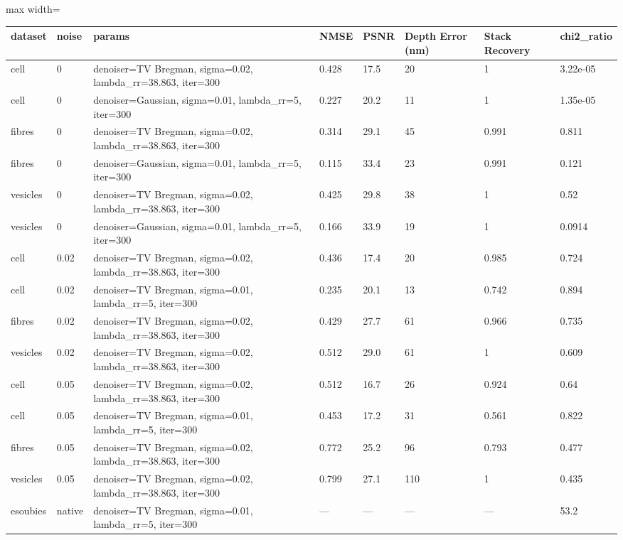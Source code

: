 \begin{center}\begin{minipage}{\linewidth}\centering
{}
\begin{adjustbox}{max width=\linewidth}
\begin{tabular}{llllllll}
\toprule
dataset & noise & params & NMSE & PSNR & Depth Error (nm) & Stack Recovery & chi2\_ratio \\
\midrule
cell & 0 & denoiser=TV Bregman, sigma=0.02, lambda\_rr=38.863, iter=300 & 0.428 & 17.5 & 20 & 1 & 3.22e-05 \\
cell & 0 & denoiser=Gaussian, sigma=0.01, lambda\_rr=5, iter=300 & 0.227 & 20.2 & 11 & 1 & 1.35e-05 \\
fibres & 0 & denoiser=TV Bregman, sigma=0.02, lambda\_rr=38.863, iter=300 & 0.314 & 29.1 & 45 & 0.991 & 0.811 \\
fibres & 0 & denoiser=Gaussian, sigma=0.01, lambda\_rr=5, iter=300 & 0.115 & 33.4 & 23 & 0.991 & 0.121 \\
vesicles & 0 & denoiser=TV Bregman, sigma=0.02, lambda\_rr=38.863, iter=300 & 0.425 & 29.8 & 38 & 1 & 0.52 \\
vesicles & 0 & denoiser=Gaussian, sigma=0.01, lambda\_rr=5, iter=300 & 0.166 & 33.9 & 19 & 1 & 0.0914 \\
cell & 0.02 & denoiser=TV Bregman, sigma=0.02, lambda\_rr=38.863, iter=300 & 0.436 & 17.4 & 20 & 0.985 & 0.724 \\
cell & 0.02 & denoiser=TV Bregman, sigma=0.01, lambda\_rr=5, iter=300 & 0.235 & 20.1 & 13 & 0.742 & 0.894 \\
fibres & 0.02 & denoiser=TV Bregman, sigma=0.02, lambda\_rr=38.863, iter=300 & 0.429 & 27.7 & 61 & 0.966 & 0.735 \\
vesicles & 0.02 & denoiser=TV Bregman, sigma=0.02, lambda\_rr=38.863, iter=300 & 0.512 & 29.0 & 61 & 1 & 0.609 \\
cell & 0.05 & denoiser=TV Bregman, sigma=0.02, lambda\_rr=38.863, iter=300 & 0.512 & 16.7 & 26 & 0.924 & 0.64 \\
cell & 0.05 & denoiser=TV Bregman, sigma=0.01, lambda\_rr=5, iter=300 & 0.453 & 17.2 & 31 & 0.561 & 0.822 \\
fibres & 0.05 & denoiser=TV Bregman, sigma=0.02, lambda\_rr=38.863, iter=300 & 0.772 & 25.2 & 96 & 0.793 & 0.477 \\
vesicles & 0.05 & denoiser=TV Bregman, sigma=0.02, lambda\_rr=38.863, iter=300 & 0.799 & 27.1 & 110 & 1 & 0.435 \\
esoubies & native & denoiser=TV Bregman, sigma=0.01, lambda\_rr=5, iter=300 & — & — & — & — & 53.2 \\
\bottomrule
\end{tabular}\end{adjustbox}\end{minipage}\end{center}
